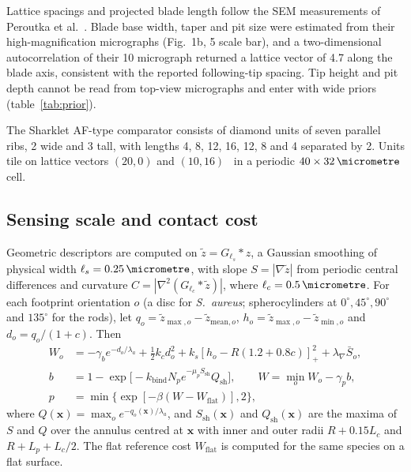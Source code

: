 \documentclass[11pt]{article}
\newcommand{\Sa}{\textit{S.~aureus}}
\begin{document}
Lattice spacings and projected blade length follow the SEM measurements of Peroutka et al.\ \cite{Peroutka2026}. Blade base width, taper and pit size were estimated from their high-magnification micrographs (Fig.~1b, \SI{5}{\micrometre} scale bar), and a two-dimensional autocorrelation of their \SI{10}{\micrometre} micrograph returned a lattice vector of \SI{4.7}{\micrometre} along the blade axis, consistent with the reported following-tip spacing. Tip height and pit depth cannot be read from top-view micrographs and enter with wide priors (table~\ref{tab:prior}).

The Sharklet AF-type comparator consists of diamond units of seven parallel ribs, \SI{2}{\micrometre} wide and \SI{3}{\micrometre} tall, with lengths 4, 8, 12, 16, 12, 8 and \SI{4}{\micrometre} separated by \SI{2}{\micrometre}. Units tile on lattice vectors $(20,0)$ and $(10,16)$~\si{\micrometre} in a periodic $40\times\SI{32}{\micrometre}$ cell.

\subsection{Sensing scale and contact cost}
Geometric descriptors are computed on $\tilde z=G_{\ell_s}\ast z$, a Gaussian smoothing of physical width $\ell_s=\SI{0.25}{\micrometre}$, with slope $S=|\nabla\tilde z|$ from periodic central differences and curvature $C=|\nabla^2(G_{\ell_c}\ast\tilde z)|$, where $\ell_c=\SI{0.5}{\micrometre}$. For each footprint orientation $o$ (a disc for \Sa{}; spherocylinders at $0^\circ,45^\circ,90^\circ$ and $135^\circ$ for the rods), let $q_o=\tilde z_{\max,o}-\tilde z_{\mathrm{mean},o}$, $h_o=\tilde z_{\max,o}-\tilde z_{\min,o}$ and $d_o=q_o/(1+c)$. Then
\begin{align}
W_o&=-\gamma_be^{-d_o/\lambda_a}+\tfrac12k_cd_o^2+k_s[h_o-R(1.2+0.8c)]_+^2+\lambda_\nabla\bar S_o,\\
b&=1-\exp\!\big[-k_{\mathrm{bind}}N_pe^{-\mu_pS_{\mathrm{sh}}}Q_{\mathrm{sh}}\big],\qquad W=\min_oW_o-\gamma_pb,\\
p&=\min\{\exp[-\beta(W-W_{\mathrm{flat}})],2\},
\end{align}
where $Q(\mathbf x)=\max_o e^{-q_o(\mathbf x)/\lambda_a}$, and $S_{\mathrm{sh}}(\mathbf x)$ and $Q_{\mathrm{sh}}(\mathbf x)$ are the maxima of $S$ and $Q$ over the annulus centred at $\mathbf x$ with inner and outer radii $R+0.15L_c$ and $R+L_p+L_c/2$. The flat reference cost $W_{\mathrm{flat}}$ is computed for the same species on a flat surface.
\end{document}
